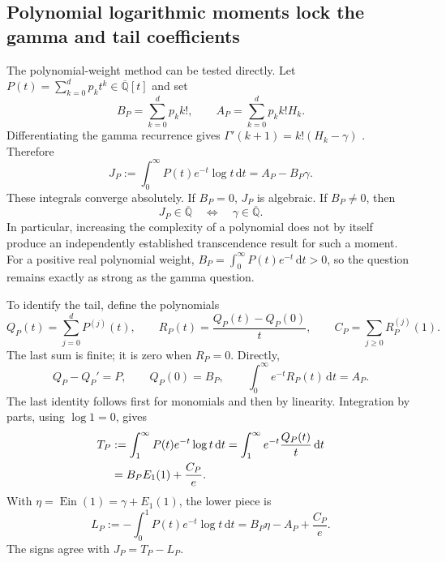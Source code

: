 \documentclass[11pt,a4paper]{article}
\numberwithin{equation}{section}
\theoremstyle{definition}
\theoremstyle{remark}
\newcommand{\Qb}{\overline{\mathbb Q}}
\newcommand{\Ein}{\operatorname{Ein}}
\newcommand{\dd}{\,\mathrm d}
\begin{document}
\subsection{Polynomial logarithmic moments lock the gamma and tail coefficients}
The polynomial-weight method can be tested directly. Let
$P(t)=\sum_{k=0}^d p_kt^k\in\Qb[t]$ and set
\begin{equation}
 B_P=\sum_{k=0}^d p_k k!,\qquad
 A_P=\sum_{k=0}^d p_k k!H_k.
\end{equation}
Differentiating the gamma recurrence gives
$\Gamma'(k+1)=k!(H_k-\gamma)$ \cite{DLMF}. Therefore
\begin{equation}\label{eq:gamma-moment}
 J_P:=\int_0^\infty P(t)e^{-t}\log t\dd t=A_P-B_P\gamma.
\end{equation}
These integrals converge absolutely. If $B_P=0$, $J_P$ is algebraic. If
$B_P\ne0$, then
\begin{equation}\label{eq:moment-equivalence}
 J_P\in\Qb\quad\Longleftrightarrow\quad\gamma\in\Qb.
\end{equation}
In particular, increasing the complexity of a polynomial does not by itself
produce an independently established transcendence result for such a
moment. For a positive real polynomial weight,
$B_P=\int_0^\infty P(t)e^{-t}\dd t>0$, so the question remains exactly
as strong as the gamma question.

To identify the tail, define the polynomials
\begin{equation}
 Q_P(t)=\sum_{j=0}^dP^{(j)}(t),\qquad
 R_P(t)=\frac{Q_P(t)-Q_P(0)}t,
 \qquad C_P=\sum_{j\ge0}R_P^{(j)}(1).
\end{equation}
The last sum is finite; it is zero when $R_P=0$. Directly,
\[
 Q_P-Q_P'=P,\qquad Q_P(0)=B_P,\qquad
 \int_0^\infty e^{-t}R_P(t)\dd t=A_P.
\]
The last identity follows first for monomials and then by linearity.
Integration by parts, using $\log1=0$, gives
\begin{align}
 T_P&:=\int_1^\infty P(t)e^{-t}\log t\dd t
   =\int_1^\infty e^{-t}\frac{Q_P(t)}t\dd t\notag\\
   &=B_PE_1(1)+\frac{C_P}{e}.\label{eq:gamma-tail}
\end{align}
With $\eta=\Ein(1)=\gamma+E_1(1)$, the lower piece is
\begin{equation}\label{eq:gamma-lower}
 L_P:=-\int_0^1P(t)e^{-t}\log t\dd t
 =B_P\eta-A_P+\frac{C_P}{e}.
\end{equation}
The signs agree with $J_P=T_P-L_P$.
\end{document}
